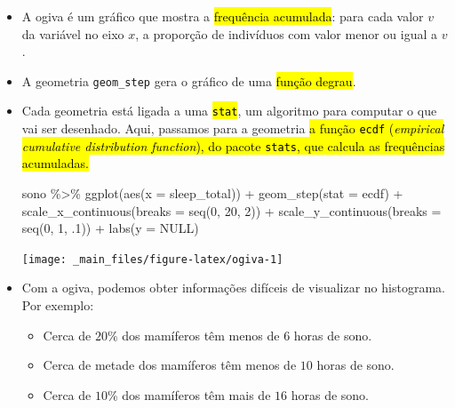 \documentclass[
  11pt]{report}
\newenvironment{Shaded}{\begin{snugshade}}{\end{snugshade}}
\newcommand{\AttributeTok}[1]{\textcolor[rgb]{0.77,0.63,0.00}{#1}}
\newcommand{\ConstantTok}[1]{\textcolor[rgb]{0.00,0.00,0.00}{#1}}
\newcommand{\DecValTok}[1]{\textcolor[rgb]{0.00,0.00,0.81}{#1}}
\newcommand{\FunctionTok}[1]{\textcolor[rgb]{0.00,0.00,0.00}{#1}}
\newcommand{\NormalTok}[1]{#1}
\newcommand{\SpecialCharTok}[1]{\textcolor[rgb]{0.00,0.00,0.00}{#1}}
\newcommand{\StringTok}[1]{\textcolor[rgb]{0.31,0.60,0.02}{#1}}
\renewenvironment{Shaded}{
    \begin{mdframed}[%
      roundcorner=2pt,%
      innerleftmargin=5pt,%
      innerrightmargin=5pt,%
      topline=true,%
      leftline=true,%
      rightline=true,%
      bottomline=true,%
      linewidth=0.5pt,%
      linecolor=black!20,%
      backgroundcolor=black!2,%
      skipabove=2ex,%
      skipbelow=2.5ex%
    ]%
  }
  {
    \end{mdframed}
  }
\begin{document}
\begin{itemize}
\item
  A ogiva é um gráfico que mostra a {\hl{frequência acumulada}}: para cada valor $v$ da variável no eixo $x$, a proporção de indivíduos com valor menor ou igual a $v$.
\item
  A geometria \texttt{geom\_step} gera o gráfico de uma {\hl{função degrau}}.
\item
  Cada geometria está ligada a uma {\hl{{\mbox{\texttt{stat}}}}}, um algoritmo para computar o que vai ser desenhado. Aqui, passamos para a geometria {\hl{a função {\mbox{\texttt{ecdf}}} (\emph{empirical cumulative distribution function}), do pacote {\mbox{\texttt{stats}}}, que calcula as frequências acumuladas.}}

\begin{Shaded}
\begin{Highlighting}[]
\NormalTok{sono }\SpecialCharTok{\%\textgreater{}\%} 
  \FunctionTok{ggplot}\NormalTok{(}\FunctionTok{aes}\NormalTok{(}\AttributeTok{x =}\NormalTok{ sleep\_total)) }\SpecialCharTok{+}
    \FunctionTok{geom\_step}\NormalTok{(}\AttributeTok{stat =} \StringTok{\textquotesingle{}ecdf\textquotesingle{}}\NormalTok{) }\SpecialCharTok{+}
    \FunctionTok{scale\_x\_continuous}\NormalTok{(}\AttributeTok{breaks =} \FunctionTok{seq}\NormalTok{(}\DecValTok{0}\NormalTok{, }\DecValTok{20}\NormalTok{, }\DecValTok{2}\NormalTok{)) }\SpecialCharTok{+}
    \FunctionTok{scale\_y\_continuous}\NormalTok{(}\AttributeTok{breaks =} \FunctionTok{seq}\NormalTok{(}\DecValTok{0}\NormalTok{, }\DecValTok{1}\NormalTok{, .}\DecValTok{1}\NormalTok{)) }\SpecialCharTok{+}
    \FunctionTok{labs}\NormalTok{(}\AttributeTok{y =} \ConstantTok{NULL}\NormalTok{)}
\end{Highlighting}
\end{Shaded}

  \begin{center}\texttt{[image: \_main\_files/figure-latex/ogiva-1]} \end{center}
\item
  Com a ogiva, podemos obter informações difíceis de visualizar no histograma. Por exemplo:

  \begin{itemize}
  \item
    Cerca de $20\%$ dos mamíferos têm menos de $6$ horas de sono.
  \item
    Cerca de metade dos mamíferos têm menos de $10$ horas de sono.
  \item
    Cerca de $10\%$ dos mamíferos têm mais de $16$ horas de sono.
  \end{itemize}
\end{itemize}
\end{document}
